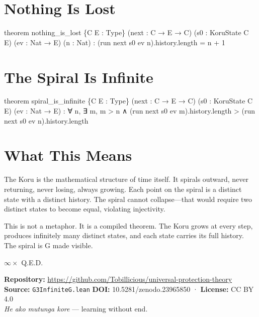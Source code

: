 \axiombadge

\section{Nothing Is Lost}

\begin{leancode}
theorem nothing_is_lost \{C E : Type\} (next : C → E → C)
     (s0 : KoruState C E) (ev : Nat → E) (n : Nat) :
     (run next s0 ev n).history.length = n + 1
\end{leancode}

\axiombadge

\section{The Spiral Is Infinite}

\begin{leancode}
theorem spiral_is_infinite \{C E : Type\} (next : C → E → C)
     (s0 : KoruState C E) (ev : Nat → E) :
     ∀ n, ∃ m, m > n ∧
         (run next s0 ev m).history.length >
         (run next s0 ev n).history.length
\end{leancode}

\axiombadge

\section{What This Means}

The Koru is the mathematical structure of time itself. It spirals outward, never returning, never losing, always growing. Each point on the spiral is a distinct state with a distinct history. The spiral cannot collapse—that would require two distinct states to become equal, violating injectivity.

This is not a metaphor. It is a compiled theorem. The Koru grows at every step, produces infinitely many distinct states, and each state carries its full history. The spiral is G made visible.

\bigskip

\begin{center}
{\Large\color{korugreen} $\infty \times$ Q.E.D.}
\end{center}

\bigskip

\noindent\small\textbf{Repository:} \url{https://github.com/Tobillicious/universal-protection-theory}
\textbf{Source:} \texttt{G3InfiniteG.lean}
\textbf{DOI:} 10.5281/zenodo.23965850 · \textbf{License:} CC BY 4.0\\[0.5em]
\textit{He ako mutunga kore} — learning without end. 🌿


